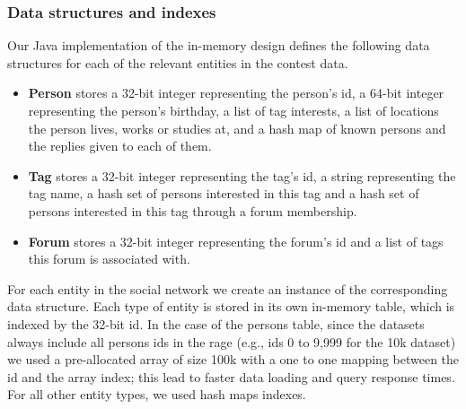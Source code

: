 \documentclass{article}
\begin{document}





\subsubsection{Data structures and indexes}
Our Java implementation of the in-memory design defines the following
data structures for each of the relevant entities in the contest data.

\begin{itemize}
\item \textbf{Person} stores a 32-bit integer representing the person's id, a 64-bit integer representing the person's birthday, a list of tag interests, a list of locations the person lives, works or studies at, and a hash map of known persons and the replies given to each of them.
\item \textbf{Tag} stores a 32-bit integer representing the tag's id, a string representing the tag name, a hash set of persons interested in this tag and a hash set of persons interested in this tag through a forum membership. 
\item \textbf{Forum} stores a 32-bit integer representing the forum's id and a list of tags this forum is associated with.
\end{itemize}

For each entity in the social network we create an instance of the corresponding data structure. Each type of entity is stored in its own in-memory table, which is indexed by the 32-bit id. In the case of the persons table, since the datasets always include all persons ids in the rage (e.g., ids 0 to 9,999 for the 10k dataset) we used a pre-allocated array of size 100k with a one to one mapping between the id and the array index; this lead to faster data loading and query response times. For all other entity types, we used hash maps indexes. 
\end{document}
